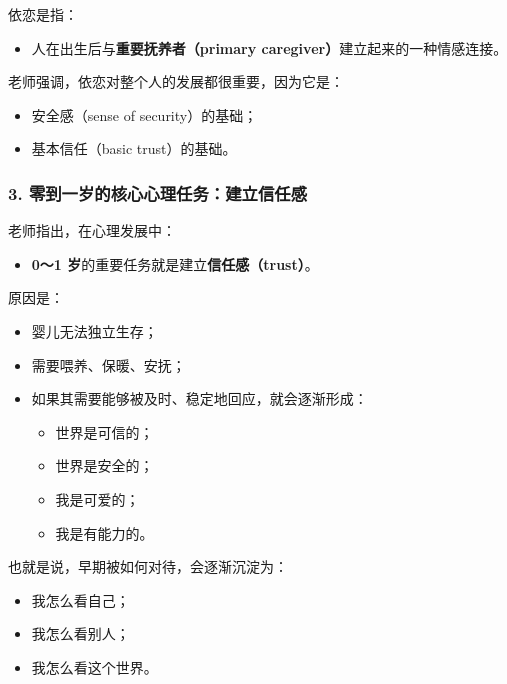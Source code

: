\documentclass[
  chinese,
  9pt,
  a4paper,
]{ctexart}
\providecommand{\tightlist}{%
  \setlength{\itemsep}{0pt}\setlength{\parskip}{0pt}}
\begin{document}
依恋是指：

\begin{itemize}
\tightlist
\item
  人在出生后与\textbf{重要抚养者（primary
  caregiver）}建立起来的一种情感连接。
\end{itemize}

老师强调，依恋对整个人的发展都很重要，因为它是：

\begin{itemize}
\tightlist
\item
  安全感（sense of security）的基础；
\item
  基本信任（basic trust）的基础。
\end{itemize}

\subsubsection{3.
零到一岁的核心心理任务：建立信任感}\label{ux96f6ux5230ux4e00ux5c81ux7684ux6838ux5fc3ux5fc3ux7406ux4efbux52a1ux5efaux7acbux4fe1ux4efbux611f}

老师指出，在心理发展中：

\begin{itemize}
\tightlist
\item
  \textbf{0～1 岁}的重要任务就是建立\textbf{信任感（trust）}。
\end{itemize}

原因是：

\begin{itemize}
\item
  婴儿无法独立生存；
\item
  需要喂养、保暖、安抚；
\item
  如果其需要能够被及时、稳定地回应，就会逐渐形成：

  \begin{itemize}
  \tightlist
  \item
    世界是可信的；
  \item
    世界是安全的；
  \item
    我是可爱的；
  \item
    我是有能力的。
  \end{itemize}
\end{itemize}

也就是说，早期被如何对待，会逐渐沉淀为：

\begin{itemize}
\tightlist
\item
  我怎么看自己；
\item
  我怎么看别人；
\item
  我怎么看这个世界。
\end{itemize}
\end{document}
